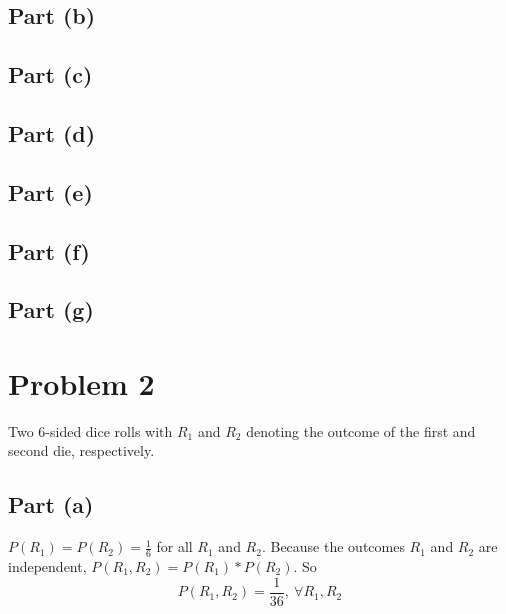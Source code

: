 \documentclass[11pt]{article}
\begin{document}
\subsection*{Part (b)}



\subsection*{Part (c)}
\subsection*{Part (d)}
\subsection*{Part (e)}
\subsection*{Part (f)}
\subsection*{Part (g)}
\section*{Problem 2}
Two 6-sided dice rolls with $R_1$ and $R_2$ denoting the outcome of the first and second die, respectively.

\subsection*{Part (a)}
$P(R_1)=P(R_2)=\frac{1}{6}$ for all $R_1$ and $R_2$. Because the outcomes $R_1$ and $R_2$ are independent, $P(R_1,R_2)=P(R_1)*P(R_2)$. So
\begin{equation*}
	P(R_1,R_2)=\frac{1}{36},\ \forall R_1,R_2
\end{equation*}
\end{document}
